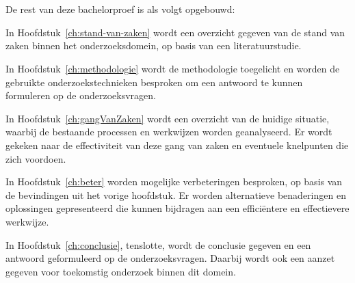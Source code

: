 \section{}%
\label{sec:opzet-bachelorproef}


De rest van deze bachelorproef is als volgt opgebouwd:

In Hoofdstuk~\ref{ch:stand-van-zaken} wordt een overzicht gegeven van de stand van zaken binnen het onderzoeksdomein, op basis van een literatuurstudie.

In Hoofdstuk~\ref{ch:methodologie} wordt de methodologie toegelicht en worden de gebruikte onderzoekstechnieken besproken om een antwoord te kunnen formuleren op de onderzoeksvragen.


In Hoofdstuk~\ref{ch:gangVanZaken} wordt een overzicht van de huidige situatie, waarbij de bestaande processen en werkwijzen worden geanalyseerd. Er wordt gekeken naar de effectiviteit van deze gang van zaken en eventuele knelpunten die zich voordoen.

In Hoofdstuk~\ref{ch:beter} worden mogelijke verbeteringen besproken, op basis van de bevindingen uit het vorige hoofdstuk. Er worden alternatieve benaderingen en oplossingen gepresenteerd die kunnen bijdragen aan een efficiëntere en effectievere werkwijze.

In Hoofdstuk~\ref{ch:conclusie}, tenslotte, wordt de conclusie gegeven en een antwoord geformuleerd op de onderzoeksvragen. Daarbij wordt ook een aanzet gegeven voor toekomstig onderzoek binnen dit domein.